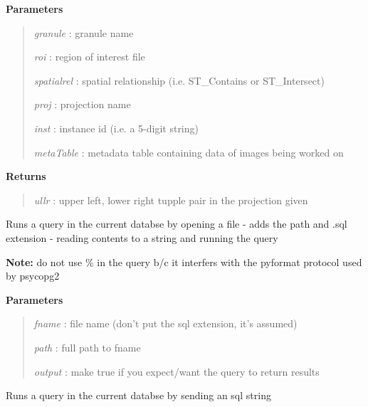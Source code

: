 \documentclass[letterpaper,10pt,openany,oneside]{sphinxmanual}
\begin{document}
\begin{fulllineitems}
\begin{fulllineitems}
\textbf{Parameters}
\begin{quote}

\emph{granule}    : granule name

\emph{roi}        : region of interest file

\emph{spatialrel} : spatial relationship (i.e. ST\_Contains or ST\_Intersect)

\emph{proj}       : projection name

\emph{inst}       : instance id (i.e. a 5-digit string)

\emph{metaTable}  : metadata table containing data of images being worked on
\end{quote}

\textbf{Returns}
\begin{quote}

\emph{ullr}       : upper left, lower right tupple pair in the projection given
\end{quote}

\end{fulllineitems}


\begin{fulllineitems}
\label{code:Database.Database.qryFromFile}
Runs a query in the current databse by opening a file - adds the path and 
.sql extension - reading contents to a string and running the query

\textbf{Note:} do not use \% in the query b/c it interfers with the pyformat protocol
used by psycopg2

\textbf{Parameters}
\begin{quote}

\emph{fname}  : file name (don't put the sql extension, it's assumed)

\emph{path}   : full path to fname

\emph{output} : make true if you expect/want the query to return results
\end{quote}

\end{fulllineitems}


\begin{fulllineitems}
\label{code:Database.Database.qryFromText}
Runs a query in the current databse by sending an sql string


\end{fulllineitems}
\end{fulllineitems}
\end{document}

